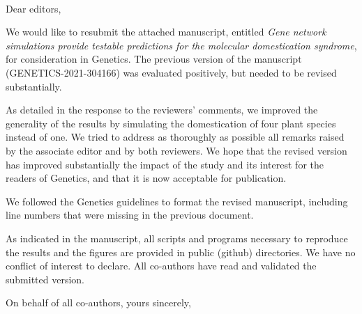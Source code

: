 \documentclass[12pt]{lettre}
\begin{document}

\begin{letter}{~}

\nodate
\nolieu

\def\concname{Subject:~}

\opening{Dear editors, }

We would like to resubmit the attached manuscript, entitled \emph{Gene network simulations provide testable predictions for the
molecular domestication syndrome}, for consideration in Genetics. The previous version of the manuscript (GENETICS-2021-304166) was evaluated positively, but needed to be revised substantially. 

As detailed in the response to the reviewers' comments, we improved the generality of the results by simulating the domestication of four plant species instead of one. We tried to address as thoroughly as possible all remarks raised by the associate editor and by both reviewers. We hope that the revised version has improved substantially the impact of the study and its interest for the readers of Genetics, and that it is now acceptable for publication. 

We followed the Genetics guidelines to format the revised manuscript, including line numbers that were missing in the previous document. 

As indicated in the manuscript, all scripts and programs necessary to reproduce the results and the figures are provided in public (github) directories. We have no conflict of interest to declare. All co-authors have read and validated the submitted version. 

\closing{On behalf of all co-authors, yours sincerely,}

\end{letter}
\end{document}
